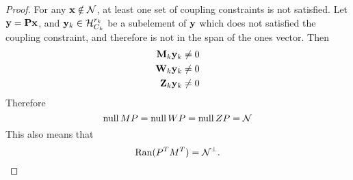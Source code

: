 \begin{proof}
For any $\mathbf{x} \notin \mathcal{N}$, at least one set of coupling constraints is not satisfied.
Let $\mathbf{y} = \mathbf{P}\mathbf{x}$, and $\mathbf{y}_k \in \mathcal{H}_{C_k}^{r_k}$ be a subelement of $\mathbf{y}$ which does not satisfied the coupling constraint, and therefore is not in the span of the ones vector.
Then 
\begin{align}
\mathbf{M}_k \mathbf{y}_k &\neq 0 \\
\mathbf{W}_k \mathbf{y}_k &\neq 0 \\
\mathbf{Z}_k \mathbf{y}_k &\neq 0 
\end{align}
Therefore 
\begin{equation}
\operatorname{null}{MP} = \operatorname{null}{WP} = \operatorname{null}{ZP} = \mathcal{N} 
\end{equation}
This also means that 
\begin{equation}\label{range_PM}
    \operatorname{Ran}(P^T M^T) = \mathcal{N}^\perp.
\end{equation}


\end{proof}
